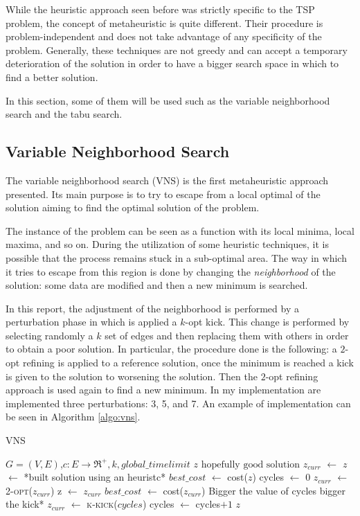 While the heuristic approach seen before was strictly specific to the TSP problem, the concept of metaheuristic is quite different. Their procedure is problem-independent and does not take advantage of any specificity of the problem. Generally, these techniques are not greedy and can accept a temporary deterioration of the solution in order to have a bigger search space in which to find a better solution.

In this section, some of them will be used such as the variable neighborhood search and the tabu search.

\subsection{Variable Neighborhood Search}
\label{sec:VNS}
The variable neighborhood search (VNS) is the first metaheuristic approach presented. Its main purpose is to try to escape from a local optimal of the solution aiming to find the optimal solution of the problem. 

The instance of the problem can be seen as a function with its local minima, local maxima, and so on. During the utilization of some heuristic techniques, it is possible that the process remains stuck in a sub-optimal area. The way in which it tries to escape from this region is done by changing the \textit{neighborhood} of the solution: some data are modified and then a new minimum is searched.

In this report, the adjustment of the neighborhood is performed by a perturbation phase in which is applied a $k$-opt kick. This change is performed by selecting randomly a $k$ set of edges and then replacing them with others in order to obtain a poor solution. In particular, the procedure done is the following: a $2$-opt refining is applied to a reference solution, once the minimum is reached a kick is given to the solution to worsening the solution. Then the $2$-opt refining approach is used again to find a new minimum. In my implementation are implemented three perturbations: 3, 5, and 7. An example of implementation can be seen in Algorithm \ref{algo:vns}.

\begin{algorithm}
	\caption{VNS}\label{algo:vns}
	\begin{algorithmic}[1]
		\Require $G=(V,E)$,$ c:E\rightarrow \Re^+, k, global\_timelimit$
		\Ensure $z\text{ hopefully good solution}$
		\State $z_{curr}$ $\gets$ $z$ $\gets$ *built solution using an heuristc*
		\State $best\_cost$ $\gets$ cost($z$)
		\State cycles $\gets$ $0$
			\State $z_{curr}$ $\gets$ \textsc{2-opt($z_{curr}$)}
				\State z $\gets$ $z_{curr}$
				\State $best\_cost$ $\gets$ cost($z_{curr}$)
			\EndIf
		\State *Bigger the value of cycles bigger the kick*
		\State $z_{curr}$ $\gets$ \textsc{k-kick($cycles$)}
		\State cycles $\gets$ cycles$+1$
		\EndWhile
		\State \Return $z$
	\end{algorithmic}
\end{algorithm}


